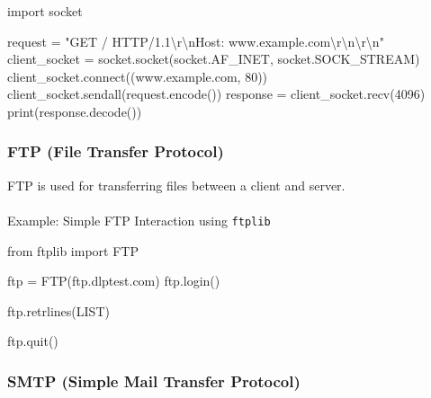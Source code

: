 \documentclass[
  letterpaper,
  DIV=11,
  numbers=noendperiod]{scrreprt}
\makeatletter
\let\oldparagraph\paragraph
\renewcommand{\paragraph}{
    \@ifstar
      \xxxParagraphStar
      \xxxParagraphNoStar
  }
\newcommand{\xxxParagraphStar}[1]{\oldparagraph*{#1}\mbox{}}
\newcommand{\xxxParagraphNoStar}[1]{\oldparagraph{#1}\mbox{}}
\newenvironment{Shaded}{\begin{snugshade}}{\end{snugshade}}
\newcommand{\BuiltInTok}[1]{\textcolor[rgb]{0.00,0.23,0.31}{#1}}
\newcommand{\CharTok}[1]{\textcolor[rgb]{0.13,0.47,0.30}{#1}}
\newcommand{\DecValTok}[1]{\textcolor[rgb]{0.68,0.00,0.00}{#1}}
\newcommand{\ExtensionTok}[1]{\textcolor[rgb]{0.00,0.23,0.31}{#1}}
\newcommand{\ImportTok}[1]{\textcolor[rgb]{0.00,0.46,0.62}{#1}}
\newcommand{\NormalTok}[1]{\textcolor[rgb]{0.00,0.23,0.31}{#1}}
\newcommand{\OperatorTok}[1]{\textcolor[rgb]{0.37,0.37,0.37}{#1}}
\newcommand{\StringTok}[1]{\textcolor[rgb]{0.13,0.47,0.30}{#1}}
\makeatother
\begin{document}
\begin{Shaded}
\begin{Highlighting}[]
\ImportTok{import}\NormalTok{ socket}

\NormalTok{request }\OperatorTok{=} \StringTok{"GET / HTTP/1.1}\CharTok{\textbackslash{}r\textbackslash{}n}\StringTok{Host: www.example.com}\CharTok{\textbackslash{}r\textbackslash{}n\textbackslash{}r\textbackslash{}n}\StringTok{"}
\NormalTok{client\_socket }\OperatorTok{=}\NormalTok{ socket.socket(socket.AF\_INET, socket.SOCK\_STREAM)}
\NormalTok{client\_socket.}\ExtensionTok{connect}\NormalTok{((}\StringTok{\textquotesingle{}www.example.com\textquotesingle{}}\NormalTok{, }\DecValTok{80}\NormalTok{))}
\NormalTok{client\_socket.sendall(request.encode())}
\NormalTok{response }\OperatorTok{=}\NormalTok{ client\_socket.recv(}\DecValTok{4096}\NormalTok{)}
\BuiltInTok{print}\NormalTok{(response.decode())}
\end{Highlighting}
\end{Shaded}

\subsubsection{FTP (File Transfer
Protocol)}\label{ftp-file-transfer-protocol}

FTP is used for transferring files between a client and server.

\paragraph{\texorpdfstring{Example: Simple FTP Interaction using
\texttt{ftplib}}{Example: Simple FTP Interaction using ftplib}}\label{example-simple-ftp-interaction-using-ftplib}

\begin{Shaded}
\begin{Highlighting}[]
\ImportTok{from}\NormalTok{ ftplib }\ImportTok{import}\NormalTok{ FTP}

\NormalTok{ftp }\OperatorTok{=}\NormalTok{ FTP(}\StringTok{\textquotesingle{}ftp.dlptest.com\textquotesingle{}}\NormalTok{)}
\NormalTok{ftp.login()}

\NormalTok{ftp.retrlines(}\StringTok{\textquotesingle{}LIST\textquotesingle{}}\NormalTok{)}

\NormalTok{ftp.quit()}
\end{Highlighting}
\end{Shaded}

\subsubsection{SMTP (Simple Mail Transfer
Protocol)}\label{smtp-simple-mail-transfer-protocol}
\end{document}
